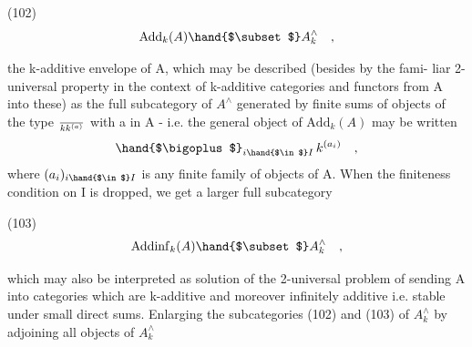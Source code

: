 (102) \[ \mathrm{Add}_{k}(A)\hand{$\subset$} A^{\wedge}_{k} \quad , \]

the k-additive envelope of A, which may be described (besides by the fami-%
liar 2-universal property in the context of k-additive categories and
functors from A into these) as the full subcategory of $A^{\wedge}$ generated by
finite sums of objects of the type $\over{k}{k}^{(a)}$ with a in A - i.e. the general
object of $\mathrm{Add}_{k}(A)$ may be written
\[ \hand{$\bigoplus$}_{i\hand{$\in$} I}\, k^{(a_{i})} \quad , \]
where $(a_{i})_{i\hand{$\in$} I}$ is any finite family of objects of A. When the finiteness
condition on I is dropped, we get a larger full subcategory

(103) \[ \mathrm{Addinf}_{k}(A)\hand{$\subset$} A^{\wedge}_{k} \quad , \]

which may also be interpreted as  solution of the 2-universal problem
of sending A into categories which are k-additive and moreover infinitely
additive i.e. stable under small direct sums.  Enlarging the 
subcategories (102) and (103) of $A^{\wedge}_{k}$ by adjoining all objects of $A^{\wedge}_{k}$

